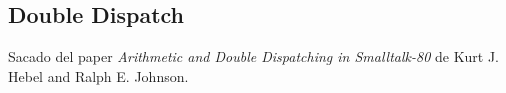 \subsection{Double Dispatch}

Sacado del paper \emph{Arithmetic and Double Dispatching in Smalltalk-80} de Kurt J. Hebel and Ralph E. Johnson. 